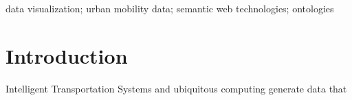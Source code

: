 \documentclass[]{interact}
\theoremstyle{plain}%
\theoremstyle{definition}
\theoremstyle{remark}
\theoremstyle{definition}
\begin{document}
\begin{keywords}
data visualization; urban mobility data; semantic web technologies; ontologies
\end{keywords}


\section{Introduction}

Intelligent Transportation Systems and ubiquitous computing generate data that



\end{document}
